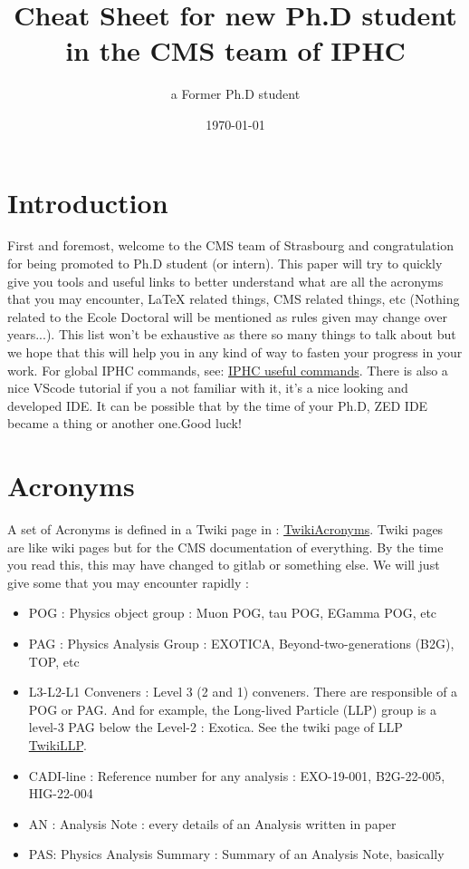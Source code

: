 \documentclass[reprint, a4paper, nofootinbib, amsmath, amssymb, aps]{revtex4-1}
\begin{document}
\title{Cheat Sheet for new Ph.D student in the CMS team of IPHC}

\author{a Former Ph.D student}

\date{\today}

\maketitle

\section{Introduction}

First and foremost, welcome to the CMS team of Strasbourg and congratulation for being promoted to Ph.D student (or intern). This paper will try to quickly give you tools and useful links to better understand what are all the acronyms that you may encounter, LaTeX related things, CMS related things, etc (Nothing related to the Ecole Doctoral will be mentioned as rules given may change over years...). This list won't be exhaustive as there so many things to talk about but we hope that this will help you in any kind of way to fasten your progress in your work. For global IPHC commands, see: \href{https://twiki.cern.ch/twiki/bin/viewauth/CMS/IPHCusefulCommands#VScode}{IPHC useful commands}. There is also a nice VScode tutorial if you a not familiar with it, it's a nice looking and developed IDE. It can be possible that by the time of your Ph.D, ZED IDE became a thing or another one.Good luck!  

\section{Acronyms}
    A set of Acronyms is defined in a Twiki page in : \href{https://twiki.cern.ch/twiki/bin/view/CMSPublic/WorkBookGlossary}{TwikiAcronyms}. Twiki pages are like wiki pages but for the CMS documentation of everything. By the time you read this, this may have changed to gitlab or something else. We will just give some that you may encounter rapidly :
    \begin{itemize}
        \item POG : Physics object group : Muon POG, tau POG, EGamma POG, etc
        \item PAG : Physics Analysis Group : EXOTICA, Beyond-two-generations (B2G), TOP, etc
        \item L3-L2-L1 Conveners : Level 3 (2 and 1) conveners. There are responsible of a POG or PAG. And for example, the Long-lived Particle (LLP) group is a level-3 PAG below the Level-2 : Exotica. See the twiki page of LLP \href{https://twiki.cern.ch/twiki/bin/viewauth/CMS/ExoticaLongLived}{TwikiLLP}.
        \item CADI-line : Reference number for any analysis : EXO-19-001, B2G-22-005, HIG-22-004
        \item AN : Analysis Note : every details of an Analysis written in paper
        \item PAS: Physics Analysis Summary : Summary of an Analysis Note, basically
    \end{itemize}
\end{document}
